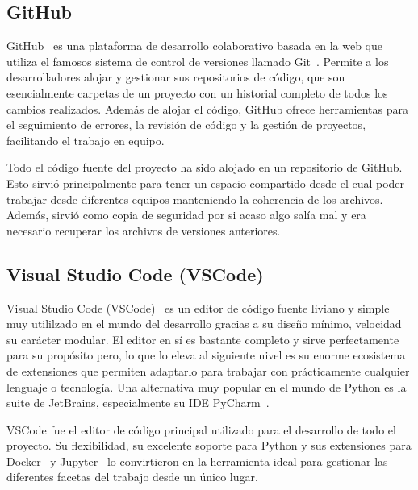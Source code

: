 \subsection{GitHub}


GitHub~\cite{githubDocs} es una plataforma de desarrollo colaborativo basada en la web que utiliza el famosos sistema de control de versiones llamado Git~\cite{gitscm}. Permite a los desarrolladores alojar y gestionar sus repositorios de código, que son esencialmente carpetas de un proyecto con un historial completo de todos los cambios realizados. Además de alojar el código, GitHub ofrece herramientas para el seguimiento de errores, la revisión de código y la gestión de proyectos, facilitando el trabajo en equipo.

Todo el código fuente del proyecto ha sido alojado en un repositorio de GitHub. Esto sirvió principalmente para tener un espacio compartido desde el cual poder trabajar desde diferentes equipos manteniendo la coherencia de los archivos. Además, sirvió como copia de seguridad por si acaso algo salía mal y era necesario recuperar los archivos de versiones anteriores.

\subsection{Visual Studio Code (VSCode)}


Visual Studio Code (VSCode)~\cite{vscodeDocs} es un editor de código fuente liviano y simple muy utililzado en el mundo del desarrollo gracias a su diseño mínimo, velocidad su carácter modular. El editor en sí es bastante completo y sirve perfectamente para su propósito pero, lo que lo eleva al siguiente nivel es su enorme ecosistema de extensiones que permiten adaptarlo para trabajar con prácticamente cualquier lenguaje o tecnología. Una alternativa muy popular en el mundo de Python es la suite de JetBrains, especialmente su IDE PyCharm~\cite{jetbrainsPyCharmOnly}.

VSCode fue el editor de código principal utilizado para el desarrollo de todo el proyecto. Su flexibilidad, su excelente soporte para Python y sus extensiones para Docker~\cite{dockerDocs} y Jupyter~\cite{jupyterProject} lo convirtieron en la herramienta ideal para gestionar las diferentes facetas del trabajo desde un único lugar.

